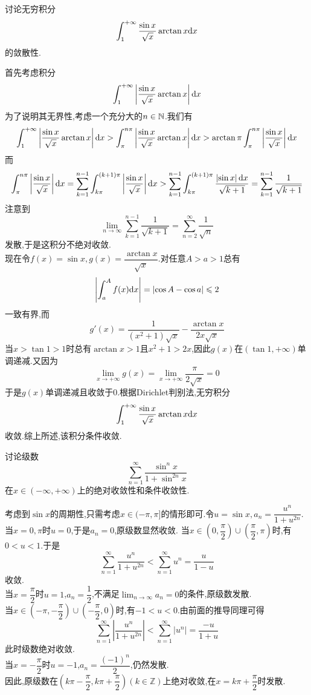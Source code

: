 \documentclass{ctexart}
\begin{document}
\begin{problem}[5.(10\songti{分})]
    讨论无穷积分
    \[\int_1^{+\infty}\dfrac{\sin x}{\sqrt{x}}\arctan x\mathrm{d} x\]
    的敛散性.
\end{problem}
\begin{solution}
    首先考虑积分
    \[\int_1^{+\infty}\left|\dfrac{\sin x}{\sqrt{x}}\arctan x\right|\mathrm{d} x\]
    为了说明其无界性,考虑一个充分大的$n\in\mathbb{N}$.我们有
    \[\int_1^{+\infty}\left|\dfrac{\sin x}{\sqrt{x}}\arctan x\right|\mathrm{d} x
    >\int_{\pi}^{n\pi}\left|\dfrac{\sin x}{\sqrt{x}}\arctan x\right|\mathrm{d} x
    >\arctan\pi\int_{\pi}^{n\pi}\left|\dfrac{\sin x}{\sqrt{x}}\right|\mathrm{d} x\]
    而
    \[\int_{\pi}^{n\pi}\left|\dfrac{\sin x}{\sqrt{x}}\right|\mathrm{d} x
    =\sum_{k=1}^{n-1}\int_{k\pi}^{(k+1)\pi}\left|\dfrac{\sin x}{\sqrt{x}}\right|\mathrm{d} x
    >\sum_{k=1}^{n-1}\int_{k\pi}^{(k+1)\pi}\dfrac{\left|\sin x\right|\mathrm{d} x}{\sqrt{k+1}}
    =\sum_{k=1}^{n-1}\dfrac{1}{\sqrt{k+1}}\]
    注意到
    \[\lim_{n\to\infty}\sum_{k=1}^{n-1}\dfrac{1}{\sqrt{k+1}}=\sum_{n=2}^{\infty}\dfrac{1}{\sqrt{n}}\]
    发散,于是这积分不绝对收敛.\\
    现在令$f(x)=\sin x,g(x)=\dfrac{\arctan x}{\sqrt{x}}$.对任意$A>a>1$总有
    \[\left|\int_a^{A}f(x)\mathrm{d} x\right|=\left|\cos A-\cos a\right|\leqslant 2\]
    一致有界,而
    \[g'(x)=\dfrac{1}{(x^2+1)\sqrt{x}}-\dfrac{\arctan x}{2x\sqrt{x}}\]
    当$x>\tan 1>1$时总有$\arctan x>1$且$x^2+1>2x$,因此$g(x)$在$(\tan 1,+\infty)$单调递减.又因为
    \[\lim_{x\to+\infty}g(x)=\lim_{x\to+\infty}\dfrac{\pi}{2\sqrt{x}}=0\]
    于是$g(x)$单调递减且收敛于$0$.根据Dirichlet判别法,无穷积分
    \[\int_1^{+\infty}\dfrac{\sin x}{\sqrt{x}}\arctan x\mathrm{d} x\]
    收敛.综上所述,该积分条件收敛.
\end{solution}
\begin{problem}[6.(10\songti{分})]
    讨论级数
    \[\sum_{n=1}^{\infty}\dfrac{\sin^n x}{1+\sin^{2n}x}\]
    在$x\in(-\infty,+\infty)$上的绝对收敛性和条件收敛性.
\end{problem}
\begin{solution}
    考虑到$\sin x$的周期性,只需考虑$x\in(-\pi,\pi]$的情形即可.令$u=\sin x,a_n=\dfrac{u^n}{1+u^{2n}}$.\\
    当$x=0,\pi$时$u=0$,于是$a_n=0$,原级数显然收敛.
    当$x\in\left(0,\dfrac\pi2\right)\cup\left(\dfrac\pi2,\pi\right)$时,有$0<u<1$.于是
    \[\sum_{n=1}^{\infty}\dfrac{u^n}{1+u^{2n}}<\sum_{n=1}^{\infty}u^n=\dfrac{u}{1-u}\]
    收敛.\\
    当$x=\dfrac\pi2$时$u=1$,$a_n=\dfrac12$,不满足$\displaystyle\lim_{n\to\infty}a_n=0$的条件,原级数发散.\\
    当$x\in\left(-\pi,-\dfrac\pi2\right)\cup\left(-\dfrac\pi2,0\right)$时,有$-1<u<0$.由前面的推导同理可得
    \[\sum_{n=1}^{\infty}\left|\dfrac{u^n}{1+u^{2n}}\right|<\sum_{n=1}^{\infty}\left|u^n\right|=\dfrac{-u}{1+u}\]此时级数绝对收敛.\\
    当$x=-\dfrac\pi2$时$u=-1$,$a_n=\dfrac{(-1)^n}{2}$,仍然发散.\\
    因此,原级数在$\left(k\pi-\dfrac\pi2,k\pi+\dfrac{\pi}{2}\right)(k\in\mathbb{Z})$上绝对收敛,在$x=k\pi+\dfrac\pi2$时发散.
\end{solution}
\end{document}
